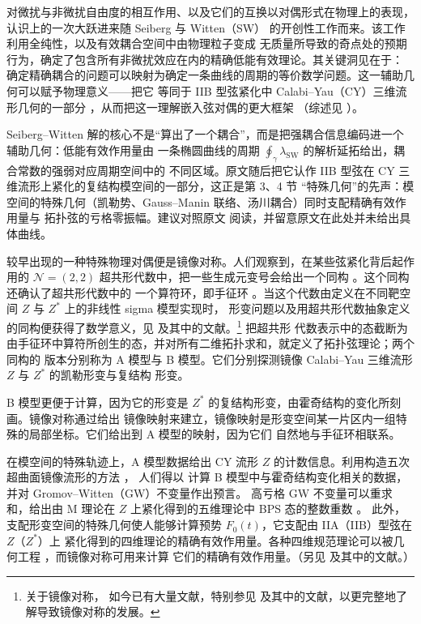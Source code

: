 对微扰与非微扰自由度的相互作用、以及它们的互换以对偶形式在物理上的表现，认识上的一次大跃进来随
Seiberg 与 Witten（SW）\cite{ref1} 的开创性工作而来。该工作利用全纯性，以及有效耦合空间中由物理粒子变成
无质量所导致的奇点处的预期行为，确定了包含所有非微扰效应在内的精确低能有效理论。其关键洞见在于：
确定精确耦合的问题可以映射为确定一条曲线的周期的等价数学问题。这一辅助几何可以赋予物理意义——把它
等同于 IIB 型弦紧化中 Calabi--Yau（CY）三维流形几何的一部分 \cite{ref2}，从而把这一理解嵌入弦对偶的更大框架
（综述见 \cite{ref3}）。

\begin{yizhu}[物理图像]
Seiberg--Witten 解的核心不是“算出了一个耦合”，而是把强耦合信息编码进一个辅助几何：低能有效作用量由
一条椭圆曲线的周期 $\oint_\gamma \lambda_{\mathrm{SW}}$ 的解析延拓给出，耦合常数的强弱对应周期空间中的
不同区域。原文随后把它认作 IIB 型弦在 CY 三维流形上紧化的复结构模空间的一部分，这正是第 3、4 节
“特殊几何”的先声：模空间的特殊几何（凯勒势、Gauss--Manin 联络、汤川耦合）同时支配精确有效作用量与
拓扑弦的亏格零振幅。建议对照原文 \cite{ref1,ref2} 阅读，并留意原文在此处并未给出具体曲线。
\end{yizhu}

较早出现的一种特殊物理对偶便是镜像对称。人们观察到，在某些弦紧化背后起作用的
$\mathcal{N}=(2,2)$ 超共形代数中，把一些生成元变号会给出一个同构 \cite{ref4}。这个同构还确认了超共形代数中的
一个算符环，即手征环 \cite{ref5}。当这个代数由定义在不同靶空间 $Z$ 与 $Z^*$ 上的非线性 sigma 模型实现时，
形变问题以及用超共形代数抽象定义的同构便获得了数学意义，见 \cite{ref6} 及其中的文献。\footnote{关于镜像对称，
如今已有大量文献，特别参见 \cite{ref7,ref8,ref9,ref10} 及其中的文献，以更完整地了解导致镜像对称的发展。} 把超共形
代数表示中的态截断为由手征环中算符所创生的态，并对所有二维拓扑求和，就定义了拓扑弦理论；两个同构的
版本分别称为 A 模型与 B 模型。它们分别探测镜像 Calabi--Yau 三维流形 $Z$ 与 $Z^*$ 的凯勒形变与复结构
形变。


B 模型更便于计算，因为它的形变是 $Z^*$ 的复结构形变，由霍奇结构的变化所刻画。镜像对称通过给出
镜像映射来建立，镜像映射是形变空间某一片区内一组特殊的局部坐标。它们给出到 A 模型的映射，因为它们
自然地与手征环相联系。

在模空间的特殊轨迹上，A 模型数据给出 CY 流形 $Z$ 的计数信息。利用构造五次超曲面镜像流形的方法 \cite{ref11}，
人们得以 \cite{ref12} 计算 B 模型中与霍奇结构变化相关的数据，并对 Gromov--Witten（GW）不变量作出预言。
高亏格 GW 不变量可以重求和，给出由 M 理论在 $Z$ 上紧化得到的五维理论中 BPS 态的整数重数 \cite{ref13,ref14}。
此外，支配形变空间的特殊几何使人能够计算预势 $F_0(t)$，它支配由 IIA（IIB）型弦在 $Z$（$Z^*$）上
紧化得到的四维理论的精确有效作用量。各种四维规范理论可以被几何工程 \cite{ref15,ref16}，而镜像对称可用来计算
它们的精确有效作用量。（另见 \cite{ref17} 及其中的文献。）

